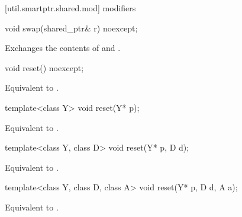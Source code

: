 [util.smartptr.shared.mod]{ modifiers}

%
%
\begin{itemdecl}
void swap(shared_ptr& r) noexcept;
\end{itemdecl}

\begin{itemdescr}

\pnum\effects  Exchanges the contents of  and .
\end{itemdescr}

%
%
\begin{itemdecl}
void reset() noexcept;
\end{itemdecl}

\begin{itemdescr}
\pnum\effects  Equivalent to .
\end{itemdescr}

%
%
\begin{itemdecl}
template<class Y> void reset(Y* p);
\end{itemdecl}

\begin{itemdescr}
\pnum\effects  Equivalent to .
\end{itemdescr}

%
%
\begin{itemdecl}
template<class Y, class D> void reset(Y* p, D d);
\end{itemdecl}

\begin{itemdescr}
\pnum\effects  Equivalent to .
\end{itemdescr}

%
%
\begin{itemdecl}
template<class Y, class D, class A> void reset(Y* p, D d, A a);
\end{itemdecl}

\begin{itemdescr}
\pnum
\effects  Equivalent to .
\end{itemdescr}

